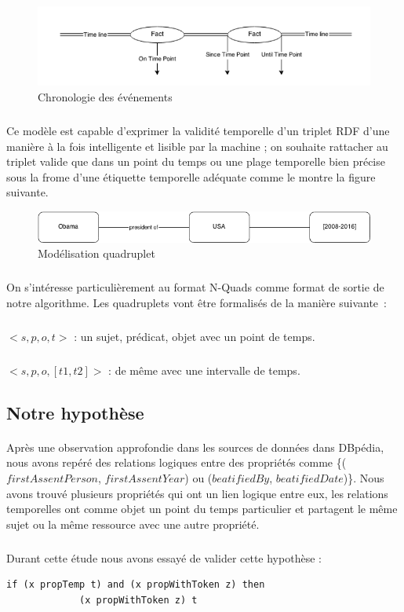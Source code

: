 \begin{figure}[H]
        \centering
                \centering
                \includegraphics[width=13cm]{timeline.png}
               \caption{Chronologie des événements}

\end{figure}
\subparagraph{}
Ce modèle est capable d'exprimer la validité temporelle d’un triplet RDF d’une manière à la fois intelligente et lisible par la machine ; on souhaite rattacher au triplet valide que dans un point du temps ou une plage temporelle bien précise sous la frome d'une étiquette temporelle adéquate comme le montre la figure suivante.
\begin{figure}[H]
        \centering
                \centering
                \includegraphics[width=13cm]{obamaQuad.png}
               \caption{Modélisation quadruplet}

\end{figure}
\subparagraph{}
On s'intéresse particulièrement au format N-Quads comme format de sortie de notre algorithme. Les quadruplets vont être formalisés de la manière suivante~:
\subparagraph{}
$<s,p,o,t>$ : un sujet, prédicat, objet avec un point de temps.
\subparagraph{}
$<s,p,o,[t1,t2]>$ : de même avec une intervalle de temps.
\subsection{Notre hypothèse}
\paragraph{}
Après une observation approfondie dans les sources de données dans DBpédia, nous avons repéré des relations logiques entre des propriétés comme \{($firstAssentPerson$, $firstAssentYear$) ou ($beatifiedBy$, $beatifiedDate$)\}. Nous avons trouvé plusieurs propriétés qui ont un lien logique entre eux, les relations temporelles ont comme objet un point du temps particulier et partagent le même sujet ou la même ressource avec une autre propriété.
\newpage
\subparagraph{}
Durant cette étude nous avons essayé de valider cette hypothèse :
\begin{verbatim}
if (x propTemp t) and (x propWithToken z) then
             (x propWithToken z) t 
\end{verbatim}

